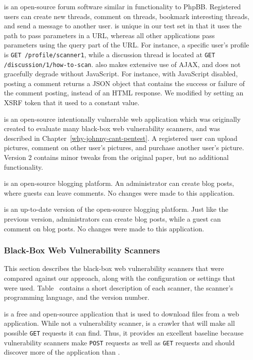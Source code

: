 \noindent \textbf{\vanillaforums{}} is an open-source forum software similar in
functionality to PhpBB. Registered users can create new threads, comment on
threads, bookmark interesting threads, and send a message to another user.
\vanillaforums{} is unique in our test set in that it uses the path to pass
parameters in a URL, whereas all other applications pass parameters using the
query part of the URL. For instance, a specific user's profile is \texttt{GET
  /profile/scanner1}, while a discussion thread is located at \texttt{GET
  /discussion/1/how-to-scan}. \vanillaforums{} also makes extensive use of
AJAX, and does not gracefully degrade without JavaScript. For instance, with
JavaScript disabled, posting a comment returns a JSON object that contains the
success or failure of the comment posting, instead of an HTML response. We
modified \vanillaforums{} by setting an XSRF token that it used to a constant
value.

\noindent \textbf{\wackopicko{}} is an open-source intentionally vulnerable web
application which was originally created to evaluate many black-box web
vulnerability scanners, and was described in Chapter~\ref{why-johnny-cant-pentest}. A registered user can upload
pictures, comment on other user's pictures, and purchase another user's
picture. Version 2 contains minor tweaks from the original paper, but no
additional functionality.

\noindent \textbf{\wordpresstwo{}} is an open-source blogging platform. An
administrator can create blog posts, where guests can leave comments. No
changes were made to this application.

\noindent \textbf{\wordpress{}} is an up-to-date version of the open-source
blogging platform. Just like the previous version, administrators can create
blog posts, while a guest can comment on blog posts. No changes were made to
this application.


\subsubsection{Black-Box Web Vulnerability Scanners}


This section describes the black-box web vulnerability scanners that were
compared against our approach, along with the configuration or settings that
were used. Table~ contains a short description of each scanner,
the scanner's programming language, and the version number.

\noindent \textbf{\wget{}} is a free and open-source application that is used
to download files from a web application. While not a vulnerability scanner,
\wget{} is a crawler that will make all possible \texttt{GET} requests it can
find. Thus, it provides an excellent baseline because vulnerability scanners make
\texttt{POST} requests as well as \texttt{GET} requests and should discover
more of the application than \wget{}.

